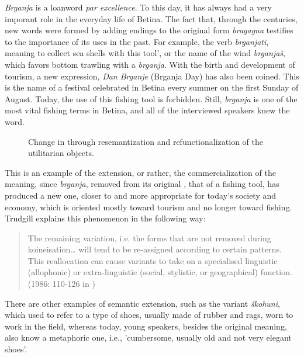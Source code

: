 \documentclass[output=paper]{LSP/langsci}
\begin{document}
\textit{Brganja} is a  loanword \textit{par excellence}. To this day, it has always had a very imporant role in the everyday life of Betina. The fact that, through the centuries, new words were formed by adding  endings to the original  form \textit{bragagna} testifies to the importance of its uses in the past. For example, the verb \textit{brganjati}, meaning to collect sea shells with this tool', or the name of the wind \textit{brganjaš}, which favors bottom trawling with a \textit{brganja}. With the birth and development of tourism, a new expression, \textit{Dan Brganje} (Brganja Day) has also been coined. This is the name of a festival celebrated in Betina every summer on the first Sunday of August. Today, the use of this fishing tool is forbidden. Still, \textit{brganja} is one of the most vital fishing terms in Betina, and all of the interviewed speakers knew the word. 

\begin{figure}[p]


\caption{Change in  through resemantization and refunctionalization of the utilitarian objects.}
\label{fig:skevin:4}
\end{figure}


This is an example of the extension, or rather, the commercialization of the meaning, since \textit{brganja}, removed from its original , that of a fishing tool, has produced a new one, closer to and more appropriate for today’s society and economy, which is oriented mostly toward tourism and no longer toward fishing. Trudgill  explains this phenomenon in the following way: 

\begin{quote}
The remaining variation, i.e. the forms that are not removed during koineisation… will tend to be re-assigned according to certain patterns. This reallocation can cause variants to take on a specialised linguistic (allophonic) or extra-linguistic (social, stylistic, or geographical) function. (1986: 110-126 in \citealt[46]{auer_study_2004})
\end{quote}

There are other examples of semantic extension, such as the variant \textit{škohuni}, which used to refer to a type of shoes, usually made of rubber and rags, worn to work in the field, whereas today, young speakers, besides the original meaning, also know a metaphoric one, i.e., 'cumbersome, usually old and not very elegant shoes'.
\end{document}

